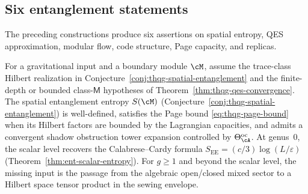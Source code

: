 %
%

\subsection{Six entanglement statements}
\label{subsec:thqg-entanglement-targets}

The preceding constructions produce six assertions on spatial
entropy, QES approximation, modular flow, code structure, Page
capacity, and replicas.

\begin{conjecture}
\ClaimStatusConjectured
\label{conj:thqg-g11-target}
For a gravitational input and a boundary module $\cM$, assume the
trace-class Hilbert realization in
Conjecture~\textup{\ref{conj:thqg-spatial-entanglement}} and the
finite-depth or bounded class-$\mathsf M$ hypotheses of
Theorem~\textup{\ref{thm:thqg-qes-convergence}}.  The spatial
entanglement entropy $S(\cM)$
\textup{(}Conjecture~\textup{\ref{conj:thqg-spatial-entanglement})}
is well-defined, satisfies the Page bound
\eqref{eq:thqg-page-bound} when its Hilbert factors are bounded by
the Lagrangian capacities, and admits a convergent
shadow obstruction tower expansion controlled by
$\Theta^{\mathrm{oc}}_\cA$.
At genus~$0$, the scalar level recovers the Calabrese--Cardy
formula $S_{\mathrm{EE}} = (c/3)\log(L/\varepsilon)$
\textup{(}Theorem~\textup{\ref{thm:ent-scalar-entropy})}.
For $g\ge1$ and beyond the scalar level, the missing input is the
passage from the algebraic open/closed mixed sector to a Hilbert
space tensor product in the sewing envelope.
\end{conjecture}

